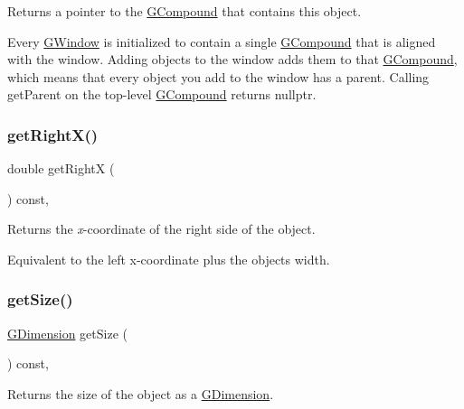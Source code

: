 Returns a pointer to the {\ttfamily \mbox{\hyperlink{classGCompound}{G\+Compound}}} that contains this object. 

Every {\ttfamily \mbox{\hyperlink{classGWindow}{G\+Window}}} is initialized to contain a single {\ttfamily \mbox{\hyperlink{classGCompound}{G\+Compound}}} that is aligned with the window. Adding objects to the window adds them to that {\ttfamily \mbox{\hyperlink{classGCompound}{G\+Compound}}}, which means that every object you add to the window has a parent. Calling {\ttfamily get\+Parent} on the top-\/level {\ttfamily \mbox{\hyperlink{classGCompound}{G\+Compound}}} returns {\ttfamily nullptr}. \mbox{\label{classGObject_a798cc79daaa10145b28f60bcdfdb0ee9}} 
\subsubsection{\texorpdfstring{get\+Right\+X()}{getRightX()}}
{\footnotesize\ttfamily double get\+RightX (\begin{DoxyParamCaption}{ }\end{DoxyParamCaption}) const\hspace{0.3cm}{\ttfamily [virtual]}, {\ttfamily [inherited]}}



Returns the {\itshape x}-\/coordinate of the right side of the object. 

Equivalent to the left x-\/coordinate plus the object\textquotesingle{}s width. \mbox{\label{classGObject_a7b4eec96a2bdc6420695d5796a78eea9}} 
\subsubsection{\texorpdfstring{get\+Size()}{getSize()}}
{\footnotesize\ttfamily \mbox{\hyperlink{classGDimension}{G\+Dimension}} get\+Size (\begin{DoxyParamCaption}{ }\end{DoxyParamCaption}) const\hspace{0.3cm}{\ttfamily [virtual]}, {\ttfamily [inherited]}}



Returns the size of the object as a {\ttfamily \mbox{\hyperlink{classGDimension}{G\+Dimension}}}. 

